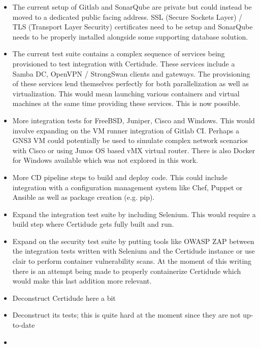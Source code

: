 \begin{itemize}
    \item The current setup of Gitlab and SonarQube are private but could instead be moved to a dedicated public facing address. SSL (Secure Sockets Layer) / TLS (Transport Layer Security) certificates need to be setup and SonarQube needs to be properly installed alongside some supporting database solution.
    \item The current test suite contains a complex sequence of services being provisioned to test integration with Certidude. These services include a Samba DC, OpenVPN / StrongSwan clients and gateways. The provisioning of these services lend themselves perfectly for both parallelization as well as virtualization. This would mean launching various containers and virtual machines at the same time providing these services. This is now possible.
    \item More integration tests for FreeBSD, Juniper, Cisco and Windows. This would involve expanding on the VM runner integration of Gitlab CI. Perhaps a GNS3 VM could potentially be used to simulate complex network scenarios with Cisco or using Junos OS based vMX virtual router. There is also Docker for Windows available which was not explored in this work.
    \item More CD pipeline steps to build and deploy code. This could include integration with a configuration management system like Chef, Puppet or Ansible as well as package creation (e.g. pip).
    \item Expand the integration test suite by including Selenium. This would require a build step where Certidude gets fully built and run.  
    \item Expand on the security test suite by putting tools like OWASP ZAP between the integration tests written with Selenium and the Certidude instance or use clair to perform container vulnerability scans. At the moment of this writing there is an attempt being made to properly containerize Certidude which would make this last addition more relevant.
\end{itemize}








\pagebreak
\pagebreak



\iffalse %

\begin{itemize}
    \item Deconstruct Certidude here a bit
    \item Deconstruct its tests; this is quite hard at the moment since they are not up-to-date
    \item 
\end{itemize}


